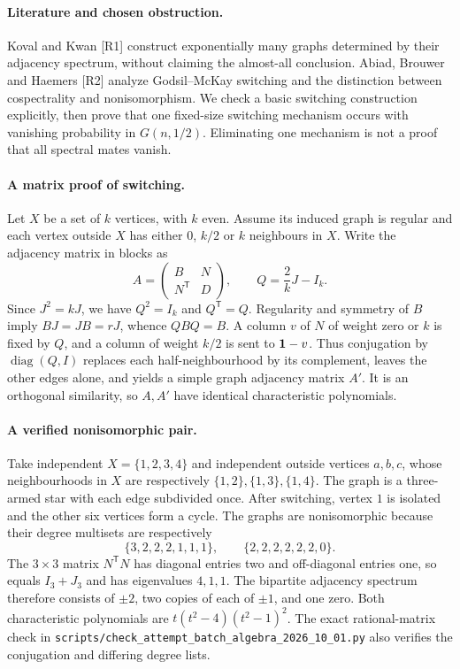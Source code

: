 \documentclass[11pt,a4paper]{article}
\begin{document}
\paragraph{Literature and chosen obstruction.}
Koval and Kwan [R1] construct exponentially many graphs determined by
their adjacency spectrum, without claiming the almost-all conclusion.
Abiad, Brouwer and Haemers [R2] analyze Godsil--McKay switching and
the distinction between cospectrality and nonisomorphism. We check a
basic switching construction explicitly, then prove that one fixed-size
switching mechanism occurs with vanishing probability in $G(n,1/2)$.
Eliminating one mechanism is not a proof that all spectral mates vanish.

\paragraph{A matrix proof of switching.}
Let $X$ be a set of $k$ vertices, with $k$ even. Assume its induced
graph is regular and each vertex outside $X$ has either $0$, $k/2$
or $k$ neighbours in $X$. Write the adjacency matrix in blocks as
\[
 A=\begin{pmatrix}B&N\\N^{\mathsf T}&D\end{pmatrix},\qquad
 Q=\frac2k J-I_k.
\]
Since $J^2=kJ$, we have $Q^2=I_k$ and $Q^{\mathsf T}=Q$.
Regularity and symmetry of $B$ imply $BJ=JB=rJ$, whence
$QBQ=B$. A column $v$ of $N$ of weight zero or $k$ is fixed by
$Q$, and a column of weight $k/2$ is sent to ${\bf1}-v$.
Thus conjugation by $\operatorname{diag}(Q,I)$ replaces each
half-neighbourhood by its complement, leaves the other edges alone,
and yields a simple graph adjacency matrix $A'$. It is an orthogonal
similarity, so $A,A'$ have identical characteristic polynomials.

\paragraph{A verified nonisomorphic pair.}
Take independent $X=\{1,2,3,4\}$ and independent outside vertices
$a,b,c$, whose neighbourhoods in $X$ are respectively
$\{1,2\},\{1,3\},\{1,4\}$. The graph is a three-armed star with
each edge subdivided once. After switching, vertex $1$ is isolated
and the other six vertices form a cycle. The graphs are nonisomorphic
because their degree multisets are respectively
\[
 \{3,2,2,2,1,1,1\},\qquad\{2,2,2,2,2,2,0\}.
\]
The $3\times3$ matrix $N^{\mathsf T}N$ has diagonal entries two
and off-diagonal entries one, so equals $I_3+J_3$ and has eigenvalues
$4,1,1$. The bipartite adjacency spectrum therefore consists of
$\pm2$, two copies of each of $\pm1$, and one zero. Both
characteristic polynomials are
$t(t^2-4)(t^2-1)^2$. The exact rational-matrix check in
\texttt{scripts/check\_attempt\_batch\_algebra\_2026\_10\_01.py}
also verifies the conjugation and differing degree lists.
\end{document}
